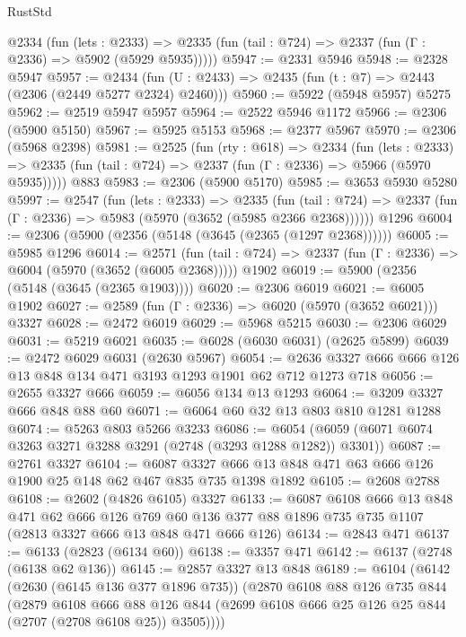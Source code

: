 \begin{lexlean}{RustStd}
\begin{coremodule}
    @2334
      (fun (lets : @2333) =>
      @2335 (fun (tail : @724) => @2337 (fun (Γ : @2336) => @5902 (@5929 @5935)))))
@5947 := @2331 @5946
@5948 := @2328 @5947
@5957 := @2434 (fun (U : @2433) => @2435 (fun (t : @7) => @2443 (@2306 (@2449 @5277 @2324) @2460)))
@5960 := @5922 (@5948 @5957) @5275
@5962 := @2519 @5947 @5957
@5964 := @2522 @5946 @1172
@5966 := @2306 (@5900 @5150)
@5967 := @5925 @5153
@5968 := @2377 @5967
@5970 := @2306 (@5968 @2398)
@5981 := @2525
    (fun (rty : @618) =>
    @2334
      (fun (lets : @2333) =>
      @2335 (fun (tail : @724) => @2337 (fun (Γ : @2336) => @5966 (@5970 @5935)))))
    @883
@5983 := @2306 (@5900 @5170)
@5985 := @3653 @5930 @5280
@5997 := @2547
    (fun (lets : @2333) =>
    @2335
      (fun (tail : @724) => @2337 (fun (Γ : @2336) => @5983 (@5970 (@3652 (@5985 @2366 @2368))))))
    @1296
@6004 := @2306 (@5900 (@2356 (@5148 (@3645 (@2365 (@1297 @2368))))))
@6005 := @5985 @1296
@6014 := @2571
    (fun (tail : @724) => @2337 (fun (Γ : @2336) => @6004 (@5970 (@3652 (@6005 @2368)))))
    @1902
@6019 := @5900 (@2356 (@5148 (@3645 (@2365 @1903))))
@6020 := @2306 @6019
@6021 := @6005 @1902
@6027 := @2589 (fun (Γ : @2336) => @6020 (@5970 (@3652 @6021))) @3327
@6028 := @2472 @6019
@6029 := @5968 @5215
@6030 := @2306 @6029
@6031 := @5219 @6021
@6035 := @6028 (@6030 @6031) (@2625 @5899)
@6039 := @2472 @6029 @6031 (@2630 @5967)
@6054 := @2636 @3327 @666 @666 @126 @13 @848 @134 @471 @3193 @1293 @1901 @62 @712 @1273 @718
@6056 := @2655 @3327 @666
@6059 := @6056 @134 @13 @1293
@6064 := @3209 @3327 @666 @848 @88 @60
@6071 := @6064 @60 @32 @13 @803 @810 @1281 @1288
@6074 := @5263 @803 @5266 @3233
@6086 := @6054 (@6059 (@6071 @6074 @3263 @3271 @3288 @3291 (@2748 (@3293 @1288 @1282)) @3301))
@6087 := @2761 @3327
@6104 := @6087 @3327 @666 @13 @848 @471 @63 @666 @126 @1900 @25 @148 @62 @467 @835 @735 @1398 @1892
@6105 := @2608 @2788
@6108 := @2602 (@4826 @6105) @3327
@6133 := @6087
    @6108
    @666
    @13
    @848
    @471
    @62
    @666
    @126
    @769
    @60
    @136
    @377
    @88
    @1896
    @735
    @735
    @1107
    (@2813 @3327 @666 @13 @848 @471 @666 @126)
@6134 := @2843 @471
@6137 := @6133 (@2823 (@6134 @60))
@6138 := @3357 @471
@6142 := @6137 (@2748 (@6138 @62 @136))
@6145 := @2857 @3327 @13 @848
@6189 := @6104
    (@6142
      (@2630 (@6145 @136 @377 @1896 @735))
      (@2870
        @6108
        @88
        @126
        @735
        @844
        (@2879
          @6108
          @666
          @88
          @126
          @844
          (@2699 @6108 @666 @25 @126 @25 @844 (@2707 (@2708 @6108 @25)) @3505))))

\end{coremodule}
\end{lexlean}
